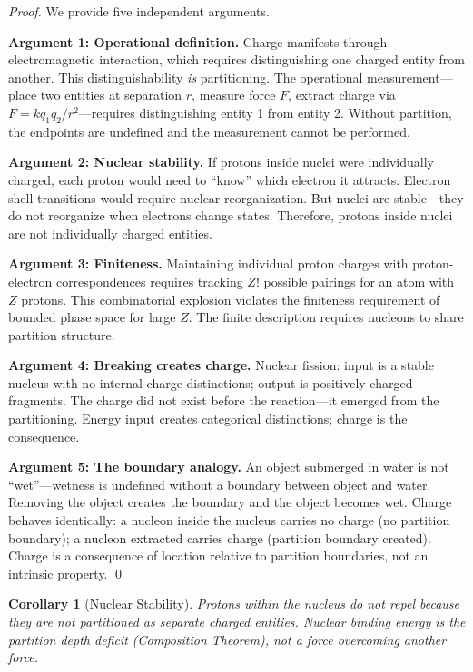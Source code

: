 \documentclass[twocolumn,10pt,a4paper]{article}
\newtheorem{corollary}[theorem]{Corollary}
\theoremstyle{definition}
\theoremstyle{remark}
\begin{document}
\begin{proof}
We provide five independent arguments.

\textbf{Argument 1: Operational definition.}
Charge manifests through electromagnetic interaction, which requires distinguishing one charged entity from another. This distinguishability \emph{is} partitioning. The operational measurement---place two entities at separation $r$, measure force $F$, extract charge via $F = kq_1q_2/r^2$---requires distinguishing entity 1 from entity 2. Without partition, the endpoints are undefined and the measurement cannot be performed.

\textbf{Argument 2: Nuclear stability.}
If protons inside nuclei were individually charged, each proton would need to ``know'' which electron it attracts. Electron shell transitions would require nuclear reorganization. But nuclei are stable---they do not reorganize when electrons change states. Therefore, protons inside nuclei are not individually charged entities.

\textbf{Argument 3: Finiteness.}
Maintaining individual proton charges with proton-electron correspondences requires tracking $Z!$ possible pairings for an atom with $Z$ protons. This combinatorial explosion violates the finiteness requirement of bounded phase space for large $Z$. The finite description requires nucleons to share partition structure.

\textbf{Argument 4: Breaking creates charge.}
Nuclear fission: input is a stable nucleus with no internal charge distinctions; output is positively charged fragments. The charge did not exist before the reaction---it emerged from the partitioning. Energy input creates categorical distinctions; charge is the consequence.

\textbf{Argument 5: The boundary analogy.}
An object submerged in water is not ``wet''---wetness is undefined without a boundary between object and water. Removing the object creates the boundary and the object becomes wet. Charge behaves identically: a nucleon inside the nucleus carries no charge (no partition boundary); a nucleon extracted carries charge (partition boundary created). Charge is a consequence of location relative to partition boundaries, not an intrinsic property. \qed
\end{proof}

\begin{corollary}[Nuclear Stability]
\label{cor:nuclear-stability}
Protons within the nucleus do not repel because they are not partitioned as separate charged entities. Nuclear binding energy is the partition depth deficit (Composition Theorem), not a force overcoming another force.
\end{corollary}
\end{document}

